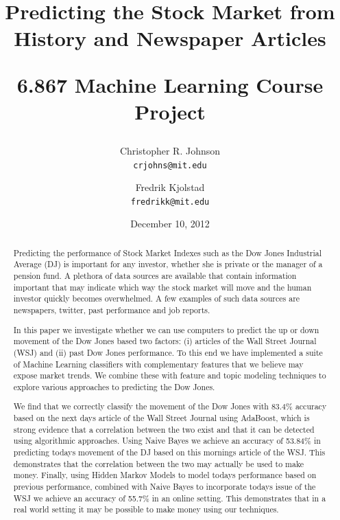 \documentclass[10pt, twocolumn]{article}
\begin{document}
\title{Predicting the Stock Market from History and Newspaper Articles \\ \begin{large}6.867 Machine Learning Course Project\end{large}}

\author{Christopher R. Johnson  \\ \texttt{crjohns@mit.edu} \and Fredrik Kjolstad \\ \texttt{fredrikk@mit.edu}}
\date{December 10, 2012}
\maketitle

\begin{abstract}
Predicting the performance of Stock Market Indexes such as the Dow Jones Industrial Average (DJ) is important for any investor, whether she is private or the manager of a pension fund.
A plethora of data sources are available that contain information important that may indicate which way the stock market will move and the human investor quickly becomes overwhelmed. A few examples of such data sources are newspapers, twitter, past performance and job reports.

In this paper we investigate whether we can use computers to predict the up or down movement of the Dow Jones based two factors: (i) articles of the Wall Street Journal (WSJ) and (ii) past Dow Jones performance.
To this end we have implemented a suite of Machine Learning classifiers with complementary features that we believe may expose market trends.
We combine these with feature and topic modeling techniques to explore various approaches to predicting the Dow Jones.

We find that we correctly classify the movement of the Dow Jones with 83.4\% accuracy based on the next days article of the Wall Street Journal using AdaBoost, which is strong evidence that a correlation between the two exist and that it can be detected using algorithmic approaches.
Using Naive Bayes we achieve an accuracy of 53.84\% in predicting todays movement of the DJ based on this mornings article of the WSJ.
This demonstrates that the correlation between the two may actually be used to make money.
Finally, using Hidden Markov Models to model todays performance based on previous performance, combined with Naive Bayes to incorporate todays issue of the WSJ we achieve an accuracy of 55.7\% in an online setting.
This demonstrates that in a real world setting it may be possible to make money using our techniques.
\end{abstract}
\end{document}
